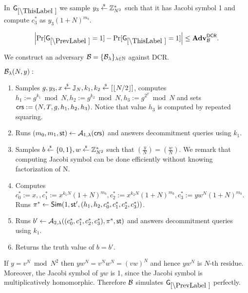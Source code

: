 In $\games_\thisgame$ we sample $y_3 \stackrel{{\scriptscriptstyle\$}}{\leftarrow} \mathbb{Z}_{N^2}^*$ such that it has Jacobi symbol 1 and compute $c_3^*$ as $y_3(1+N)^{m_b}$. 

\begin{lemma}\label{lem:dcr-rom-lh}
\[
\left|\Pr[\games_\prevgame = 1] - \Pr[\games_\thisgame = 1]\right| \leq \advtg_\advB^\dcr.
\]
\end{lemma}
We construct an adversary $\mathcal{B} = \{\mathcal{B}_{\lambda}\}_{\lambda \in \mathbb{N}}$ against DCR.

$\mathcal{B}_{\lambda}(N,y):$
\vspace{-2mm}
\begin{enumerate}
\item Samples $g, y_3, x \stackrel{{\scriptscriptstyle\$}}{\leftarrow} \mathbb{J}_N, k_1, k_2 \stackrel{{\scriptscriptstyle\$}}{\leftarrow} [\left\lfloor N/2 \right\rfloor]$, computes $h_1 := g^{k_1} \bmod N, h_2 := g^{k_2} \bmod N,  h_3 := g^{2^{T}} \bmod N$ and sets $\mathsf{crs}:=(N, T, g, h_1, h_2, h_3)$. Notice that value $h_3$ is computed by repeated squaring.
\item Runs $(m_0, m_1, \mathsf{st}) \leftarrow \mathcal{A}_{1, \lambda}(\mathsf{crs})$ and answers decommitment queries using $k_1$.
\item Samples $b \stackrel{{\scriptscriptstyle\$}}{\leftarrow} \{0,1\}, w \stackrel{{\scriptscriptstyle\$}}{\leftarrow} \mathbb{Z}_{N^2}^*$ such that $\left( \frac{y}{N} \right)= \left( \frac{w}{N} \right)$. We remark that computing Jacobi symbol can be done efficiently without knowing factorization of N.
\item Computes $c_0^*:=x, , c_1^*:=x^{k_1N}(1+N)^{m_b}, c_2^*:=x^{k_2N}(1+N)^{m_b}, c_3^*:=yw^{N}(1+N)^{m_b}$. Runs $\pi^* \leftarrow \mathsf{Sim}(1, \mathsf{st}', (h_1, h_2, c_0^*, c_1^*, c_2^*, c_3^*))$.
\item Runs $b' \leftarrow \mathcal{A}_{2, \lambda}((c_0^*, c_1^*, c_2^*, c_3^*), \pi^*, \mathsf{st})$ and answers decommitment queries using $k_1$.
\item Returns the truth value of $b=b'$.
\end{enumerate}

If $y = v^N \bmod N^2$ then $yw^N = v^N w^N = (vw)^N$ and hence $yw^N$ is $N$-th residue. Moreover, the Jacobi symbol of $yw$ is 1, since the Jacobi symbol is multiplicatively homomorphic. Therefore $\mathcal{B}$ simulates $\games_\prevgame$ perfectly. 

